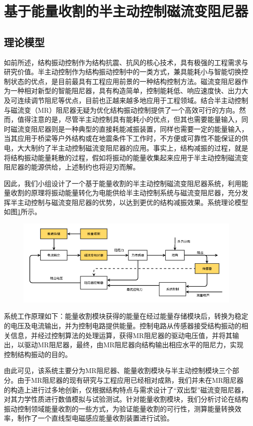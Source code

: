 \section{基于能量收割的半主动控制磁流变阻尼器}
\subsection{理论模型}
如前所述，结构振动控制作为结构抗震、抗风的核心技术，具有极强的工程需求与研究价值。半主动控制作为结构振动控制中的一类方式，兼具能耗小与智能切换控制状态的优点，是目前最具有工程应用前景的一种结构控制方法。磁流变阻尼器作为一种相对新型的智能阻尼器，具有构造简单，控制能耗低、响应速度快、出力大及可连续调节阻尼等优点，目前也正越来越多地应用于工程领域。结合半主动控制与磁流变（MR）阻尼器无疑为优化结构振动控制提供了一个高效可行的方向。然而，值得注意的是，尽管半主动控制具有能耗小的优点，但其也需要能量输入，同时磁流变阻尼器则是一种典型的直接耗能减振装置，同样也需要一定的能量输入，当其应用于桥梁等户外结构或在地震条件下工作时，不方便或可靠性不能保证的供电，大大制约了半主动控制磁流变阻尼器的应用。事实上，结构减振的过程，就是将结构振动能量耗散的过程，假如将振动的能量收集起来应用于半主动控制磁流变阻尼器的能源供给，上述制约也将迎刃而解。

因此，我们小组设计了一个基于能量收割的半主动控制磁流变阻尼器系统，利用能量收割的原理将振动能量转化为电能供给半主动控制系统与磁流变阻尼器，充分发挥半主动控制与磁流变阻尼器的优势，以达到更优的结构减振效果。系统理论模型如图\ref{system}所示。


\begin{figure}[H]
\centering
{}
\label{system}
\includegraphics[width=0.7\linewidth]{figure/structure}
\end{figure}

系统工作原理如下：能量收割模块获得的能量在经过能量存储模块后，转换为稳定的电压及电流输出，并为控制电路提供能量。控制电路从传感器接受结构振动的相关信息，并经过控制算法的处理运算，获得MR阻尼器的驱动电压值，并将其输出，以驱动MR阻尼器，最终，由MR阻尼器向结构输出相应水平的阻尼力，实现控制结构振动的目的。

由此可见，该系统主要分为MR阻尼器、能量收割模块与半主动控制模块三个部分。由于MR阻尼器的现有研究与工程应用已经相对成熟，我们并未在MR阻尼器的构造上进行过多地创新，仅根据结构特点与需求设计了“双出型”磁流变阻尼器，对其力学性质进行数值模拟与试验测试。针对能量收割模块，我们分析讨论在结构振动控制领域能量收割的一些方式，为验证能量收割的可行性，测算能量转换效率，制作了一个直线型电磁感应能量收割装置进行试验。

